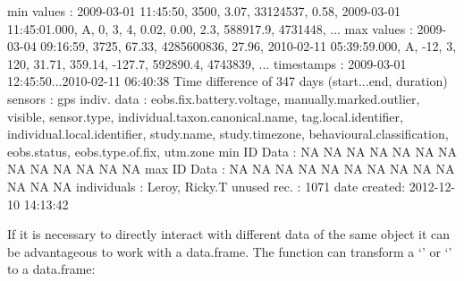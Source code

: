 \documentclass[article,nojss]{jss}
\newcommand{\fct}[1]{{\code{#1()}}}
\newcommand{\class}[1]{{`\code{#1}'}}
\begin{document}
\begin{Schunk}
\begin{Soutput}
min values  : 2009-03-01 11:45:50,                 3500,                              3.07,              33124537,                         0.58, 2009-03-01 11:45:01.000,           A,                0,                3,                         4,         0.02,    0.00,                    2.3,    588917.9,      4731448, ... 
max values  : 2009-03-04 09:16:59,                 3725,                             67.33,            4285600836,                        27.96, 2010-02-11 05:39:59.000,           A,              -12,                3,                       120,        31.71,  359.14,                 -127.7,    592890.4,      4743839, ... 
timestamps  : 2009-03-01 12:45:50...2010-02-11 06:40:38 Time difference of 347 days  (start...end, duration) 
sensors     : gps 
indiv. data : eobs.fix.battery.voltage, manually.marked.outlier, visible, sensor.type, individual.taxon.canonical.name, tag.local.identifier, individual.local.identifier, study.name, study.timezone, behavioural.classification, eobs.status, eobs.type.of.fix, utm.zone 
min ID Data : NA NA NA NA NA NA NA NA NA NA NA NA NA 
max ID Data : NA NA NA NA NA NA NA NA NA NA NA NA NA 
individuals : Leroy, Ricky.T 
unused rec. : 1071 
date created: 2012-12-10 14:13:42 
\end{Soutput}
\end{Schunk}

If it is necessary to directly interact with different data of the same object it can be advantageous to work with a data.frame. The \fct{as} function can transform a \class{Move} or \class{MoveStack} to a data.frame:
\end{document}

